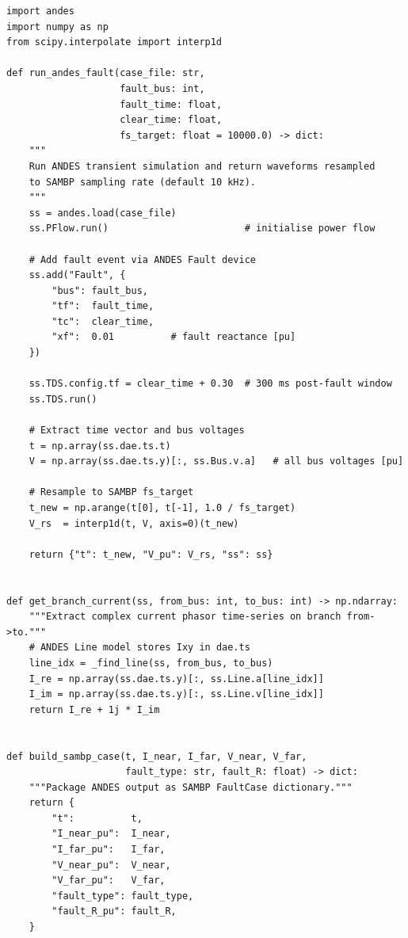 \documentclass[11pt,a4paper]{article}
\begin{document}
\begin{lstlisting}[style=python, caption={04\_code/sambp/io\_utils/andes\_adapter.py}]
import andes
import numpy as np
from scipy.interpolate import interp1d

def run_andes_fault(case_file: str,
                    fault_bus: int,
                    fault_time: float,
                    clear_time: float,
                    fs_target: float = 10000.0) -> dict:
    """
    Run ANDES transient simulation and return waveforms resampled
    to SAMBP sampling rate (default 10 kHz).
    """
    ss = andes.load(case_file)
    ss.PFlow.run()                        # initialise power flow

    # Add fault event via ANDES Fault device
    ss.add("Fault", {
        "bus": fault_bus,
        "tf":  fault_time,
        "tc":  clear_time,
        "xf":  0.01          # fault reactance [pu]
    })

    ss.TDS.config.tf = clear_time + 0.30  # 300 ms post-fault window
    ss.TDS.run()

    # Extract time vector and bus voltages
    t = np.array(ss.dae.ts.t)
    V = np.array(ss.dae.ts.y)[:, ss.Bus.v.a]   # all bus voltages [pu]

    # Resample to SAMBP fs_target
    t_new = np.arange(t[0], t[-1], 1.0 / fs_target)
    V_rs  = interp1d(t, V, axis=0)(t_new)

    return {"t": t_new, "V_pu": V_rs, "ss": ss}


def get_branch_current(ss, from_bus: int, to_bus: int) -> np.ndarray:
    """Extract complex current phasor time-series on branch from->to."""
    # ANDES Line model stores Ixy in dae.ts
    line_idx = _find_line(ss, from_bus, to_bus)
    I_re = np.array(ss.dae.ts.y)[:, ss.Line.a[line_idx]]
    I_im = np.array(ss.dae.ts.y)[:, ss.Line.v[line_idx]]
    return I_re + 1j * I_im


def build_sambp_case(t, I_near, I_far, V_near, V_far,
                     fault_type: str, fault_R: float) -> dict:
    """Package ANDES output as SAMBP FaultCase dictionary."""
    return {
        "t":          t,
        "I_near_pu":  I_near,
        "I_far_pu":   I_far,
        "V_near_pu":  V_near,
        "V_far_pu":   V_far,
        "fault_type": fault_type,
        "fault_R_pu": fault_R,
    }
\end{lstlisting}
\end{document}
